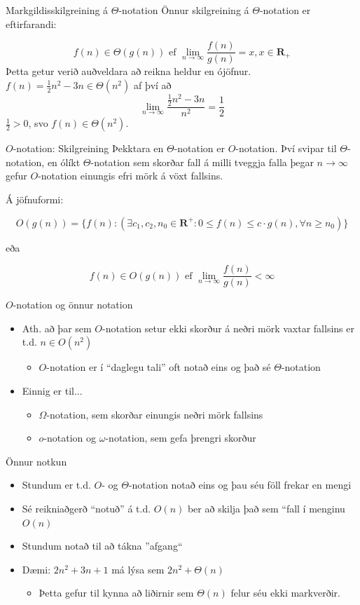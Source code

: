 \documentclass{beamer}
\begin{document}
\begin{frame}{Markgildisskilgreining á $\Theta$-notation}
Önnur skilgreining á $\Theta$-notation er eftirfarandi:

\[
  f(n) \in \Theta(g(n)) \text{ ef } \lim_{n\to \infty}\frac{f(n)}{g(n)} = x, x \in \mathbf{R_+}
\]
Þetta getur verið auðveldara að reikna heldur en ójöfnur. $f(n) = \frac{1}{2}n^2 - 3n \in \Theta(n^2)$ af því að
\[
 \lim_{n\to \infty} \frac{\frac{1}{2}n^2 - 3n}{n^2} = \frac{1}{2}
\]
$\frac{1}{2} > 0$, svo $f(n) \in \Theta(n^2)$.
\end{frame}


\begin{frame}{$O$-notation: Skilgreining}
Þekktara en $\Theta$-notation er $O$-notation. Því svipar til $\Theta$-notation, en ólíkt $\Theta$-notation sem skorðar fall á milli tveggja falla þegar $n \to \infty$ gefur $O$-notation einungis efri mörk á vöxt fallsins.

Á jöfnuformi:

\[O(g(n)) = \{ f(n) : (\exists c_1, c_2, n_0 \in \mathbf{R}^+ : 0 \leq f(n) \leq c\cdot g(n), \forall n \geq n_0 )\}\]

eða

\[
  f(n) \in O(g(n)) \text{ ef } \lim_{n\to \infty}\frac{f(n)}{g(n)} < \infty
\]
\end{frame}


\begin{frame}{$O$-notation og önnur notation}
\begin{itemize}
 \item Ath. að þar sem $O$-notation setur ekki skorður á neðri mörk vaxtar fallsins er t.d. $n \in O(n^2)$
 \begin{itemize}
  \item $O$-notation er í ``daglegu tali'' oft notað eins og það sé $\Theta$-notation
 \end{itemize}
 \item Einnig er til...
 \begin{itemize}
  \item $\Omega$-notation, sem skorðar einungis neðri mörk fallsins
  \item $o$-notation og $\omega$-notation, sem gefa þrengri skorður
 \end{itemize}
\end{itemize}
\end{frame}

\begin{frame}{Önnur notkun}
\begin{itemize}
 \item Stundum er t.d. $O$- og $\Theta$-notation notað eins og þau séu föll frekar en mengi
 \item Sé reikniaðgerð ``notuð'' á t.d. $O(n)$ ber að skilja það sem ``fall í menginu $O(n)$
 \item Stundum notað til að tákna ''afgang`` 
 \item Dæmi: $2n^2 + 3n + 1$ má lýsa sem $2n^2 + \Theta(n)$
 \begin{itemize}
  \item Þetta gefur til kynna að liðirnir sem $\Theta(n)$ felur séu ekki markverðir.
 \end{itemize}
\end{itemize}
\end{frame}
\end{document}
